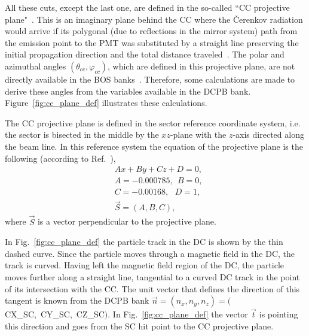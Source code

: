 All these cuts, except the last one, are defined in the so-called ``CC projective plane"~\cite{Osipenko:2004}. This is an imaginary plane behind the CC where the \v Cerenkov radiation would arrive if its polygonal (due to reflections in the mirror system) path from the emission point to the PMT was substituted by a straight line preserving the initial propagation direction and the total distance traveled~\cite{Osipenko:2004,Adams:2001kk}. The polar and azimuthal angles $(\theta_{cc},\varphi_{cc})$, which are defined in this projective plane, are not directly available in the BOS banks~\cite{BOS:bank}. Therefore, some calculations are made to derive these angles from the variables available in the DCPB bank. Figure~\ref{fig:cc_plane_def} illustrates these calculations.



The CC projective plane is defined in the sector reference coordinate system, i.e. the sector is bisected in the middle by the $xz$-plane with the $z$-axis directed along the beam line. In this reference system the equation of the projective plane is the following (according to Ref.~\cite{Osipenko:2004}),
\begin{equation}
\begin{aligned}
 &Ax+By+Cz+D = 0,  \\ \label{eq:cc_plane}
 &A=-0.000785,~~B=0,  \\
 &C=-0.00168,~~~D=1,  \\
 &\overrightarrow{S} = (A,B,C),
\end{aligned}  
\end{equation}
where $\overrightarrow{S}$ is a vector perpendicular to the projective plane.

In Fig.~\ref{fig:cc_plane_def} the particle track in the DC is shown by the thin dashed curve. Since the particle moves through a magnetic field in the DC, the track is curved. Having left the magnetic field region of the DC, the particle moves further along a straight line, tangential to a curved DC track in the point of its intersection with the CC. The unit vector that defines the direction of this tangent is known from the DCPB bank $ \overrightarrow{n} = (n_{x}, n_{y}, n_{z}) = ($CX\_SC,~CY\_SC,~CZ\_SC$)$. In Fig.~\ref{fig:cc_plane_def} the vector $ \overrightarrow{t}$ is pointing this direction and goes from the SC hit point to the CC projective plane.

